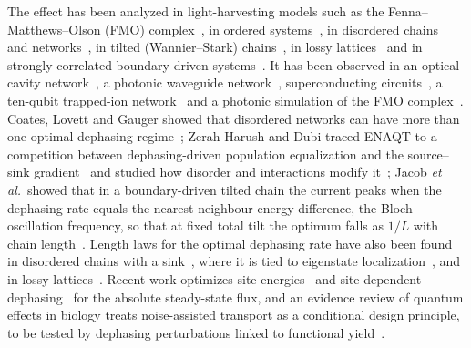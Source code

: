 \documentclass[aps,pre,preprint,floatfix]{revtex4-2}
\begin{document}
The effect has been analyzed in light-harvesting models such as the
Fenna--Matthews--Olson (FMO) complex~\cite{mohseni2008,plenio2008,rebentrost2009,caruso2009,wu2010,moix2011},
in ordered systems~\cite{kassal2012}, in disordered
chains~\cite{znidaric2013,moix2013,novo2016,zhang2017,zerahharush2020,coates2021}
and networks~\cite{zerahharush2018,coates2023}, in tilted (Wannier--Stark)
chains~\cite{burkhardt2013,jacob2024}, in lossy
lattices~\cite{skalkin2025} and in strongly correlated boundary-driven
systems~\cite{yeler2026}.
It has been observed in an optical cavity network~\cite{viciani2015}, a
photonic waveguide network~\cite{biggerstaff2016}, superconducting
circuits~\cite{potocnik2018}, a ten-qubit trapped-ion
network~\cite{maier2019} and a photonic simulation of the FMO
complex~\cite{tang2024}.
Coates, Lovett and Gauger showed that disordered networks can have more than
one optimal dephasing regime~\cite{coates2023}; Zerah-Harush and Dubi traced
ENAQT to a competition between dephasing-driven population equalization and the
source--sink gradient~\cite{zerahharush2018} and studied how disorder and
interactions modify it~\cite{zerahharush2020}; Jacob \textit{et al.}\ showed
that in a boundary-driven tilted chain the current peaks when the dephasing rate
equals the nearest-neighbour energy difference, the Bloch-oscillation
frequency, so that at fixed total tilt the optimum falls as $1/L$ with chain
length~\cite{jacob2024}.
Length laws for the optimal dephasing rate have also been found in disordered
chains with a sink~\cite{zhang2017}, where it is tied to eigenstate
localization~\cite{coates2021}, and in lossy lattices~\cite{skalkin2025}.
Recent work optimizes site energies~\cite{lawrence2026} and site-dependent
dephasing~\cite{lawrence2026b} for the absolute steady-state flux, and an
evidence review of quantum effects in biology treats noise-assisted
transport as a conditional design principle, to be tested by dephasing
perturbations linked to functional yield~\cite{gassab2026}.
\end{document}
